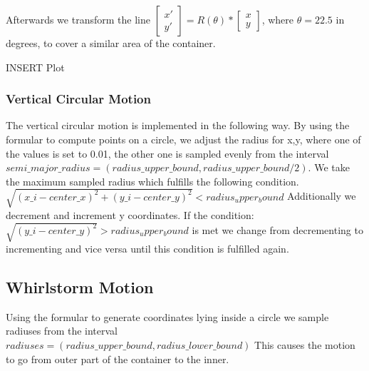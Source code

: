 Afterwards we transform the line  $\begin{bmatrix} x' \\ y' \end{bmatrix} = R(\theta) * \begin{bmatrix} x \\ y \end{bmatrix}$, where 
$\theta=22.5$ in degrees, to cover a similar area of the container. 

INSERT Plot

\subsubsection{Vertical Circular Motion}
The vertical circular motion is implemented in the following way.
By using the formular to compute points on a circle, we adjust the radius for 
x,y, where one of the values is set to 0.01, the other one is sampled evenly from the interval $semi\_major\_radius = (radius\_upper\_bound,radius\_upper\_bound / 2 ).$
We take the maximum sampled radius which fulfills the following condition. 
$\sqrt{(x\_{i} - center\_x)^2 + (y\_{i} - center\_y)^2} < radius_upper_bound$
Additionally we decrement and increment y coordinates. If the condition: $\sqrt{(y\_{i} - center\_y)^2} > radius_upper_bound$
is met we change from decrementing to incrementing and vice versa until this condition is fulfilled again.

\subsection*{Whirlstorm Motion}

Using the formular to generate coordinates lying inside a circle we sample radiuses from the interval $radiuses = (radius\_upper\_bound, radius\_lower\_bound)$
This causes the motion to go from outer part of the container to the inner. 
